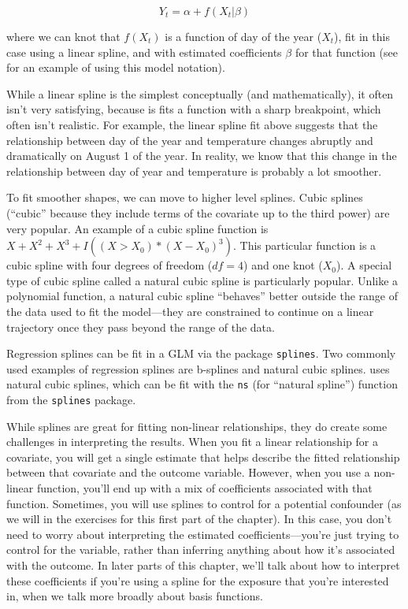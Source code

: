 \documentclass[
]{book}
\begin{document}
\[
Y_t = \alpha + f(X_t | \beta)
\]

where we can knot that \(f(X_t)\) is a function of day of the year (\(X_t\)), fit in
this case using a linear spline, and with estimated coefficients \(\beta\) for that
function (see \citet{armstrong2006models} for an example of using this model notation).

While a linear spline is the simplest conceptually (and mathematically), it often
isn't very satisfying, because is fits a function with a sharp breakpoint, which
often isn't realistic. For example, the linear spline fit above suggests that the
relationship between day of the year and temperature changes abruptly and dramatically
on August 1 of the year. In reality, we know that this change in the relationship
between day of year and temperature is probably a lot smoother.

To fit smoother shapes, we can move to higher level splines. Cubic splines
(``cubic'' because they include terms of the covariate up to the third power) are
very popular.
An example of a cubic spline
function is \(X+X^{2}+X^{3}+I((X>X_{0})*(X-X_{0})^3)\). This particular function is
a cubic spline with four degrees of freedom (\(df=4\)) and one knot (\(X_{0}\)).
A special type of cubic spline called a natural cubic spline is particularly popular.
Unlike a polynomial function, a natural cubic spline ``behaves'' better outside
the range of the data used to fit the model---they are constrained to continue
on a linear trajectory once they pass beyond the range of the data.

Regression splines can be fit in a GLM via the package \texttt{splines}. Two commonly
used examples of regression splines are b-splines and natural cubic
splines. \citet{vicedo2019hands} uses natural cubic splines, which can be fit with the
\texttt{ns} (for ``natural spline'') function from the \texttt{splines} package.

While splines are great for fitting non-linear relationships, they do create some
challenges in interpreting the results. When you fit a linear relationship for
a covariate, you will get a single estimate that helps describe the fitted relationship
between that covariate and the outcome variable. However, when you use a non-linear
function, you'll end up with a mix of coefficients associated with that function.
Sometimes, you will use splines to control for a potential confounder (as we
will in the exercises for this first part of the chapter). In this case, you don't
need to worry about interpreting the estimated coefficients---you're just trying to
control for the variable, rather than inferring anything about how it's associated
with the outcome.
In later parts of this chapter, we'll talk about how to interpret these coefficients
if you're using a spline for the exposure that you're interested in, when we talk
more broadly about basis functions.
\end{document}
